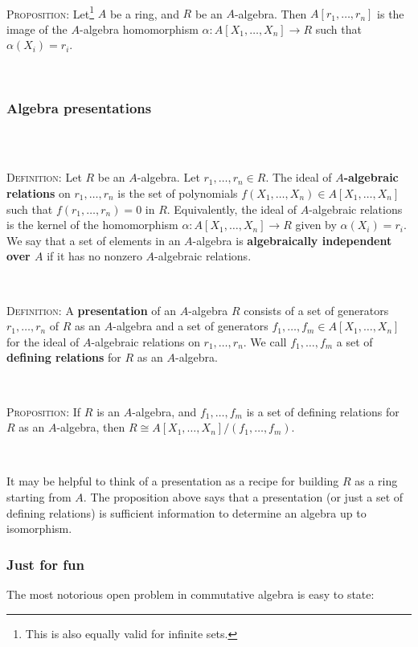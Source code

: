 \documentclass[12pt]{amsart}
\newcommand{\0}{$\phantom{.}$}
\newcommand{\1}{\mathbbm{1}}
\newcommand{\sssec}[1]{\subsubsection*{#1}}
\begin{document}
\

\noindent \textsc{Proposition:} Let\footnote{This is also equally valid for infinite sets.} $A$ be a ring, and $R$ be an $A$-algebra. Then $A[r_1,\dots,r_n]$ is the image of the $A$-algebra homomorphism $\alpha: A[X_1,\dots,X_n]\to R$ such that $\alpha(X_i) = r_i$.

\



\sssec{Algebra presentations} \0

\

\noindent \textsc{Definition:} Let $R$ be an $A$-algebra. Let $r_1,\dots,r_n\in R$. The ideal of \textbf{$A$-algebraic relations} on $r_1,\dots,r_n$ is the set of polynomials $f(X_1,\dots,X_n)\in A[X_1,\dots,X_n]$ such that $f(r_1,\dots,r_n)=0$ in $R$. Equivalently, the ideal of $A$-algebraic relations is the kernel of the homomorphism $\alpha: A[X_1,\dots,X_n]\to R$ given by $\alpha(X_i)=r_i$. We say that a set of elements in an $A$-algebra is \textbf{algebraically independent over $A$} if it has  no nonzero $A$-algebraic relations.


\

\noindent \textsc{Definition:} A \textbf{presentation} of an $A$-algebra $R$ consists of a set of generators $r_1,\dots,r_n$ of $R$ as an $A$-algebra and a set of generators $f_1,\dots,f_m\in A[X_1,\dots,X_n]$ for the ideal of $A$-algebraic relations on $r_1,\dots,r_n$. We call $f_1,\dots,f_m$ a set of \textbf{defining relations} for $R$ as an $A$-algebra.

\

\noindent \textsc{Proposition:} If $R$ is an $A$-algebra, and $f_1,\dots,f_m$ is a set of defining relations for $R$ as an $A$-algebra, then $R\cong A[X_1,\dots,X_n]/(f_1,\dots,f_m)$.

\

It may be helpful to think of a presentation as a recipe for building $R$ as a ring starting from $A$. The proposition above says that a presentation (or just a set of defining relations) is sufficient information to determine an algebra up to isomorphism.








\vfill

\noindent \hrulefill

\subsubsection*{Just for fun} The most notorious open problem in commutative algebra is easy to state: 
\end{document}
